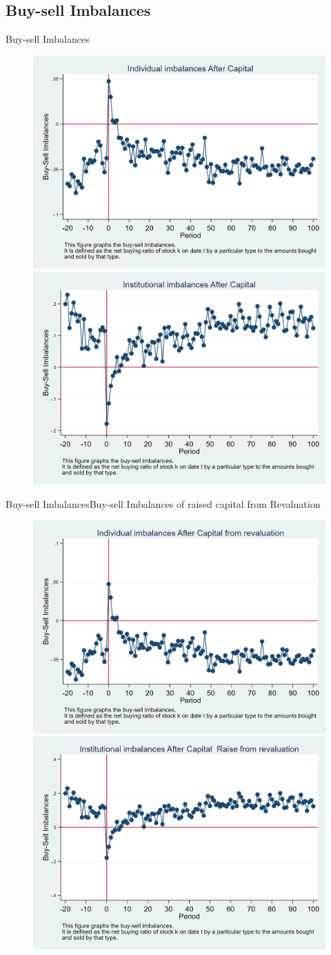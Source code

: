 \documentclass{beamer}
\begin{document}
\subsection{Buy-sell Imbalances}

\begin{frame}{Buy-sell Imbalances}
\begin{figure}
\centering
\includegraphics[width=0.45\linewidth]{Output/IndImb.png}
\includegraphics[width=0.45\linewidth]{Output/InsImb.png}
\label{fig:indimb}
\end{figure}
\end{frame}
\begin{frame}{Buy-sell Imbalances}{Buy-sell Imbalances of raised capital from Revaluation}
\begin{figure}
\centering
\includegraphics[width=0.45\linewidth]{Output/IndImb_Revaluation.png}
\includegraphics[width=0.45\linewidth]{Output/InsImb_Revaluation.png}
\label{fig:indimbrevaluation}
\end{figure}
\end{frame}
\end{document}
